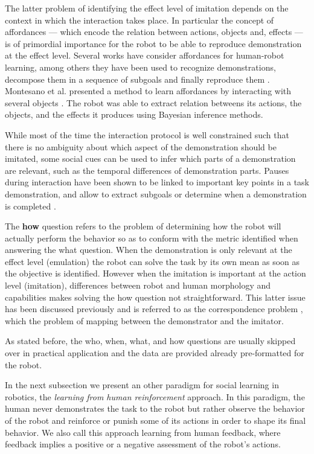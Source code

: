 The latter problem of identifying the effect level of imitation depends on the context in which the interaction takes place. In particular the concept of affordances \cite{gibson1986ecological} --- which encode the relation between actions, objects and, effects --- is of primordial importance for the robot to be able to reproduce demonstration at the effect level. Several works have consider affordances for human-robot learning, among others they have been used to recognize demonstrations, decompose them in a sequence of subgoals and finally reproduce them \cite{macl07affimit}. Montesano et al. presented a method to learn affordances by interacting with several objects \cite{montesano2008learning}. The robot was able to extract relation betweens its actions, the objects, and the effects it produces using Bayesian inference methods.

While most of the time the interaction protocol is well constrained such that there is no ambiguity about which aspect of the demonstration should be imitated, some social cues can be used to infer which parts of a demonstration are relevant, such as the temporal differences of demonstration parts. Pauses during interaction have been shown to be linked to important key points in a task demonstration, and allow to extract subgoals or determine when a demonstration is completed \cite{theofilis2013temporal}.

The \textbf{how} question refers to the problem of determining how the robot will actually perform the behavior so as to conform with the metric identified when answering the what question. When the demonstration is only relevant at the effect level (emulation) the robot can solve the task by its own mean as soon as the objective is identified. However when the imitation is important at the action level (imitation), differences between robot and human morphology and capabilities makes solving the how question not straightforward. This latter issue has been discussed previously and is referred to as the correspondence problem \cite{nehaniv2002correspondence}, which the problem of mapping between the demonstrator and the imitator.

\transition

As stated before, the who, when, what, and how questions are usually skipped over in practical application and the data are provided already pre-formatted for the robot.

In the next subsection we present an other paradigm for social learning in robotics, the \emph{learning from human reinforcement} approach. In this paradigm, the human never demonstrates the task to the robot but rather observe the behavior of the robot and reinforce or punish some of its actions in order to shape its final behavior. We also call this approach learning from human feedback, where feedback implies a positive or a negative assessment of the robot's actions.

